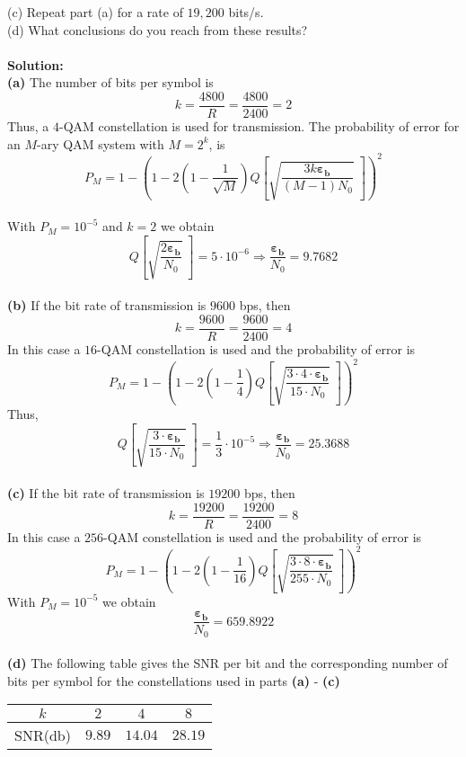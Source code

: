 \documentclass[a4paper,12pt]{article}
\begin{document}
\begin{enumerate}
            (c) Repeat part (a) for a rate of $19,200$ bits/s. \\ 
            (d) What conclusions do you reach from these results? \\  \\ 
            \textbf{Solution:} \\
            \textbf{(a)} The number of bits per symbol is $$k = \frac{4800}{R} = \frac{4800}{2400} = 2$$ Thus, a $4$-QAM constellation is used for transmission. The probability of error for an $M$-ary QAM system with $M = 2^k$, is $$P_M = 1 - \left( 1 - 2 \left( 1 - \frac{1}{\sqrt{M}} \right) Q \left[ \sqrt{\frac{3k\bm{\varepsilon_b}}{(M - 1) N_0}} \; \right] \right)^2$$ \\ 
            With $P_M = 10^{-5}$ and $k = 2$ we obtain $$Q \left[ \sqrt{\frac{2 \bm{\varepsilon_b}}{N_0}} \; \right] = 5 \cdot 10^{-6} \Rightarrow \frac{\bm{\varepsilon_b}}{N_0} = 9.7682$$ \\ 
            \textbf{(b)} If the bit rate of transmission is $9600$ bps, then $$k = \frac{9600}{R} = \frac{9600}{2400} = 4$$ In this case a $16$-QAM constellation is used and the probability of error is $$P_M = 1 - \left( 1 - 2 \left( 1 - \frac{1}{4} \right) Q \left[ \sqrt{\frac{3 \cdot 4 \cdot \bm{\varepsilon_b}}{15 \cdot N_0}} \; \right] \right)^2$$ Thus, $$Q \left[ \sqrt{\frac{3 \cdot \bm{\varepsilon_b}}{15 \cdot N_0}} \; \right] = \frac{1}{3} \cdot 10^{-5} \Rightarrow \frac{\bm{\varepsilon_b}}{N_0} = 25.3688$$ \\ 
            \textbf{(c)} If the bit rate of transmission is $19200$ bps, then $$k = \frac{19200}{R} = \frac{19200}{2400} = 8$$ In this case a $256$-QAM constellation is used and the probability of error is $$P_M = 1 - \left( 1 - 2 \left( 1 - \frac{1}{16} \right) Q \left[ \sqrt{\frac{3 \cdot 8 \cdot \bm{\varepsilon_b}}{255 \cdot N_0}} \; \right] \right)^2$$ With $P_M = 10^{-5}$ we obtain $$\frac{\bm{\varepsilon_b}}{N_0} = 659.8922$$ \\ 
            \newpage
            \textbf{(d)} The following table gives the SNR per bit and the corresponding number of bits per symbol for the constellations used in parts \textbf{(a)} - \textbf{(c)} 
            \begin{center}
                \begin{tabular}{ | c || c | c | c |} 
                 \hline
                 $k$ &  $2$ & $4$ & $8$ \\ 
                 \hline
                 SNR(db) & $9.89$ & $14.04$ & $28.19$ \\ 

\end{tabular}
\end{center}
\end{enumerate}
\end{document}
